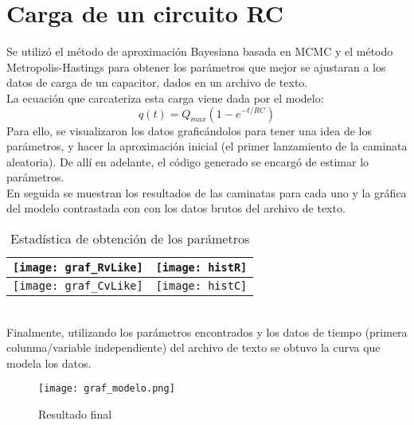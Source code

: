 \documentclass{article}
\begin{document}
\section{Carga de un circuito RC}
Se utiliz\'o el m\'etodo de aproximaci\'on Bayesiana basada en MCMC y el m\'etodo Metropolis-Hastings para obtener los par\'ametros que mejor se ajustaran a los datos de carga de un capacitor, dados en un archivo de texto.\\
La ecuaci\'on que carcateriza esta carga viene dada por el modelo:\\
\begin{equation}
    q(t) = Q_{max}(1-e^{-t/RC})
\end{equation}
Para ello, se visualizaron los datos grafic\'andolos para tener una idea de los par\'ametros, y hacer la aproximaci\'on inicial (el primer lanzamiento de la caminata aleatoria). De all\'i en adelante, el c\'odigo generado se encarg\'o de estimar lo par\'ametros. \\
En seguida se muestran los resultados de las caminatas para cada uno y la gr\'afica del modelo contrastada con con los datos brutos del archivo de texto.\\
\begin{table}
    \centering
    \begin{tabular}{|cc|}
        \hline
        \texttt{[image: graf\_RvLike]} & \texttt{[image: histR]} \\
        \hline
        \texttt{[image: graf\_CvLike]} & \texttt{[image: histC]} \\
        \hline
    \end{tabular}
    \caption{Estad\'istica de obtenci\'on de los par\'ametros}
\end{table}\\
Finalmente, utilizando los par\'ametros encontrados y los datos de tiempo (primera colunma/variable independiente) del archivo de texto se obtuvo la curva que modela los datos.\\
\begin{figure}
    \centering
    \texttt{[image: graf\_modelo.png]}
    \caption{Resultado final}
\end{figure}
\end{document}
